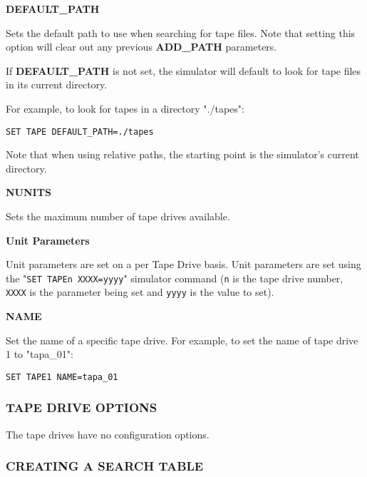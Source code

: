 \textbf{DEFAULT\_PATH}

\begin{adjustwidth}{5ex}{1ex}
	Sets the default path to use when searching for tape files. Note that setting this option will clear
	out any previous \textbf{ADD\_PATH} parameters.
	
	If \textbf{DEFAULT\_PATH} is not set, the simulator will default to look for tape files in its current directory.

	For example, to look for tapes in a directory "./tapes":
\begin{adjustwidth}{5ex}{1ex}
	\texttt{SET TAPE DEFAULT\_PATH=./tapes}
\end{adjustwidth}  
	Note that when using relative paths, the starting point is the simulator's current directory.
\end{adjustwidth}  

\textbf{NUNITS}

\begin{adjustwidth}{5ex}{1ex}
	Sets the maximum number of tape drives available.
\end{adjustwidth}  


\textbf{Unit Parameters}

Unit parameters are set on a per Tape Drive basis. Unit parameters are set using 
the "\texttt{SET TAPEn XXXX=yyyy}" simulator command (\texttt{n} is the tape drive number, \texttt{XXXX} is 
the parameter being set and \texttt{yyyy} is the value to set). 

\textbf{NAME}

\begin{adjustwidth}{5ex}{1ex}
	Set the name of a specific tape drive. For example, to set the name of tape drive 1 to "tapa\_01":
\begin{adjustwidth}{5ex}{1ex}
	\texttt{SET TAPE1 NAME=tapa\_01}
\end{adjustwidth}  
\end{adjustwidth}  


\subsubsection[Tape Drive Options]{TAPE DRIVE OPTIONS}

The tape drives have no configuration options.

\subsubsection[Creating a Search Table]{CREATING A SEARCH TABLE}

